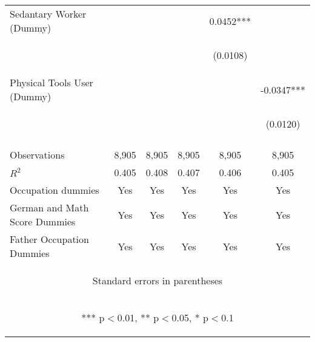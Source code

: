 \begin{center}
\begin{tabular}{lccccc}
Sedantary Worker (Dummy) &  &  &  & 0.0452*** &  \\
\vspace{4pt} & \begin{footnotesize}\end{footnotesize} & \begin{footnotesize}\end{footnotesize} & \begin{footnotesize}\end{footnotesize} & \begin{footnotesize}(0.0108)\end{footnotesize} & \begin{footnotesize}\end{footnotesize} \\
Physical Tools User (Dummy) &  &  &  &  & -0.0347*** \\
 & \begin{footnotesize}\end{footnotesize} & \begin{footnotesize}\end{footnotesize} & \begin{footnotesize}\end{footnotesize} & \begin{footnotesize}\end{footnotesize} & \begin{footnotesize}(0.0120)\end{footnotesize} \\
\vspace{4pt} & \begin{footnotesize}\end{footnotesize} & \begin{footnotesize}\end{footnotesize} & \begin{footnotesize}\end{footnotesize} & \begin{footnotesize}\end{footnotesize} & \begin{footnotesize}\end{footnotesize} \\
Observations & 8,905 & 8,905 & 8,905 & 8,905 & 8,905 \\
$R^2$ & 0.405 & 0.408 & 0.407 & 0.406 & 0.405 \\
Occupation dummies & Yes & Yes & Yes & Yes & Yes \\
German and Math Score Dummies & Yes & Yes & Yes & Yes & Yes \\
 Father Occupation Dummies & Yes & Yes & Yes & Yes & Yes \\ \hline
\multicolumn{6}{c}{\begin{footnotesize} Standard errors in parentheses\end{footnotesize}} \\
\multicolumn{6}{c}{\begin{footnotesize} *** p$<$0.01, ** p$<$0.05, * p$<$0.1\end{footnotesize}} \\
\end{tabular}
\end{center}
